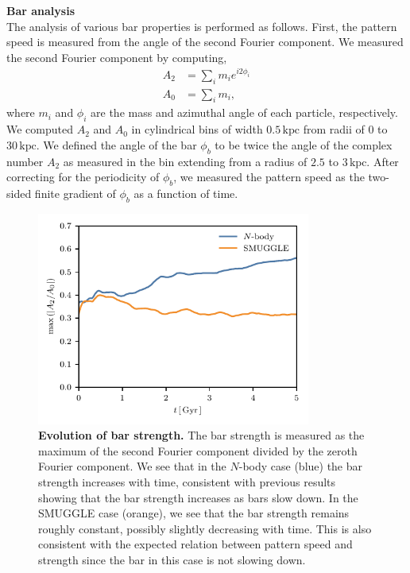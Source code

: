 \documentclass[twoside]{natureprintstyle}
\newcommand{\Nbody}{$N$-body}
\begin{document}
\noindent
{\bf Bar analysis}
\\
\noindent
The analysis of various bar properties is performed as follows. First, the
pattern speed is measured from the angle of the second Fourier component. We
measured the second Fourier component by computing,
\begin{equation}
\begin{split}
A_2 &= \sum_i m_i e^{i 2 \phi_i} \\
A_0 &= \sum_i m_i \textrm{,}
\end{split}
\end{equation}
where $m_i$ and $\phi_i$ are the mass and azimuthal angle of each particle,
respectively. We computed $A_2$ and $A_0$ in cylindrical bins of width
$0.5\,\textrm{kpc}$ from radii of $0$ to $30\,\textrm{kpc}$. We defined the
angle of the bar $\phi_b$ to be twice the angle of the complex number $A_2$ as
measured in the bin extending from a radius of $2.5$ to $3\,\textrm{kpc}$.
After correcting for the periodicity of $\phi_b$, we measured the pattern
speed as the two-sided finite gradient of $\phi_b$ as a function of time.

\begin{figure}[t!]%
\centering
\includegraphics[width=9cm]{fig/A2_over_A0.pdf}
\caption{\textbf{Evolution of bar strength.} The bar strength is measured as
the maximum of the second Fourier component divided by the zeroth Fourier
component. We see that in the
\Nbody{} case (blue) the bar strength increases with time, consistent with
previous results showing that the bar strength increases as bars slow down. In
the SMUGGLE case (orange), we see that the bar strength remains roughly
constant, possibly slightly decreasing with time. This is also consistent with
the expected relation between pattern speed and strength since the bar in this
case is not slowing down.}
\label{fig:strength}
\end{figure}
\end{document}
